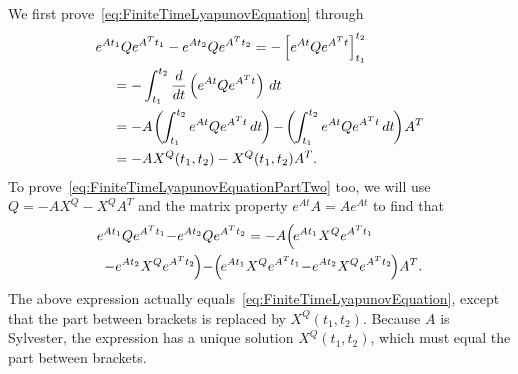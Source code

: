 \documentclass[twocolumn]{autart}
\begin{document}
\begin{pf}
We first prove~\eqref{eq:FiniteTimeLyapunovEquation} through
\begin{align}
& e^{A t_1} Q e^{A^T t_1} - e^{A t_2} Q e^{A^T t_2} = -\left[e^{A t} Q e^{A^T t}\right]_{t_1}^{t_2} \nonumber \\
& \hspace{12pt} = -\int_{t_1}^{t_2} \frac{d}{dt} \left(e^{A t} Q e^{A^T t}\right) \, dt \nonumber \\
& \hspace{12pt} = -A \hspace{-1pt}\left(\hspace{-1pt}\int_{t_1}^{t_2} e^{A t} Q e^{A^T t} \, dt\hspace{-1pt}\right) \hspace{-1pt}-\hspace{-1pt} \left(\hspace{-1pt}\int_{t_1}^{t_2} e^{A t} Q e^{A^T t} \, dt\hspace{-1pt}\right)\hspace{-1pt} A^T \nonumber \\
& \hspace{12pt} = -A X^Q(t_1,t_2) - X^Q(t_1,t_2) A^T.
\end{align}
To prove~\eqref{eq:FiniteTimeLyapunovEquationPartTwo} too, we will use $Q = -AX^Q - X^Q A^T$ and the matrix property $e^{A t}A = Ae^{A t}$ to find that
\begin{align}
& e^{A t_1} Q e^{A^T t_1} \hspace{-2pt}-\hspace{-2pt} e^{A t_2} Q e^{A^T t_2} = -A \Big(\hspace{-1pt}e^{A t_1} X^Q e^{A^T t_1} \hspace{3pt} \\
& \hspace{5pt} \hspace{-2pt}-\hspace{-2pt} e^{A t_2} X^Q e^{A^T t_2}\hspace{-1pt}\Big) \hspace{-2pt}-\hspace{-2pt} \Big(\hspace{-1pt}e^{A t_1} X^Q e^{A^T t_1} \hspace{-2pt}-\hspace{-2pt} e^{A t_2} X^Q e^{A^T t_2}\hspace{-1pt}\Big) A^T. \nonumber
\end{align}
The above expression actually equals~\eqref{eq:FiniteTimeLyapunovEquation}, except that the part between brackets is replaced by $X^Q(t_1,t_2)$. Because $A$ is Sylvester, the expression has a unique solution $X^Q(t_1,t_2)$, which must equal the part between brackets.
\end{pf}
\end{document}
